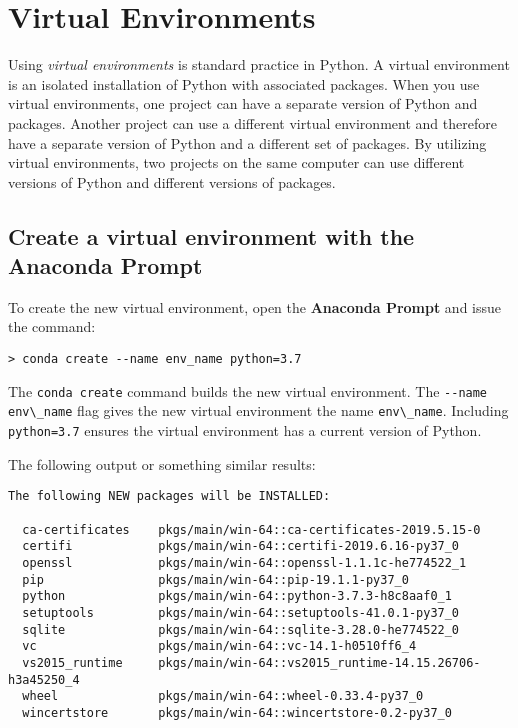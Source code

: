 \documentclass{book}
\newcommand{\passthrough}[1]{#1}
\begin{document}
    
        \hypertarget{virtual-environments}{%
\section{Virtual Environments}\label{virtual-environments}}
    




    
        Using \emph{virtual environments} is standard practice in Python. A
virtual environment is an isolated installation of Python with
associated packages. When you use virtual environments, one project can
have a separate version of Python and packages. Another project can use
a different virtual environment and therefore have a separate version of
Python and a different set of packages. By utilizing virtual
environments, two projects on the same computer can use different
versions of Python and different versions of packages.
    




    
        \hypertarget{create-a-virtual-environment-with-the-anaconda-prompt}{%
\subsection{Create a virtual environment with the Anaconda
Prompt}\label{create-a-virtual-environment-with-the-anaconda-prompt}}

To create the new virtual environment, open the \textbf{Anaconda Prompt}
and issue the command:

\begin{lstlisting}
> conda create --name env_name python=3.7
\end{lstlisting}

The \passthrough{\lstinline!conda create!} command builds the new
virtual environment. The \passthrough{\lstinline!--name env\_name!} flag
gives the new virtual environment the name
\passthrough{\lstinline!env\_name!}. Including
\passthrough{\lstinline!python=3.7!} ensures the virtual environment has
a current version of Python.

The following output or something similar results:

\begin{lstlisting}
The following NEW packages will be INSTALLED:

  ca-certificates    pkgs/main/win-64::ca-certificates-2019.5.15-0
  certifi            pkgs/main/win-64::certifi-2019.6.16-py37_0
  openssl            pkgs/main/win-64::openssl-1.1.1c-he774522_1
  pip                pkgs/main/win-64::pip-19.1.1-py37_0
  python             pkgs/main/win-64::python-3.7.3-h8c8aaf0_1
  setuptools         pkgs/main/win-64::setuptools-41.0.1-py37_0
  sqlite             pkgs/main/win-64::sqlite-3.28.0-he774522_0
  vc                 pkgs/main/win-64::vc-14.1-h0510ff6_4
  vs2015_runtime     pkgs/main/win-64::vs2015_runtime-14.15.26706-h3a45250_4
  wheel              pkgs/main/win-64::wheel-0.33.4-py37_0
  wincertstore       pkgs/main/win-64::wincertstore-0.2-py37_0
\end{lstlisting}
\end{document}
